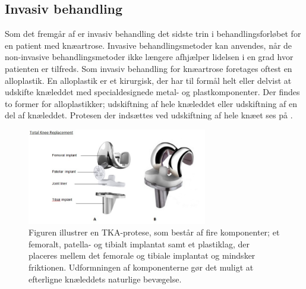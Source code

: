 
%

\subsection{Invasiv behandling} \label{kirurgiskbehandling}
Som det fremgår af  er invasiv behandling det sidste trin i behandlingsforløbet for en patient med knæartrose. Invasive behandlingsmetoder kan anvendes, når de non-invasive behandlingsmetoder ikke længere afhjælper lidelsen i en grad hvor patienten er tilfreds. Som invasiv behandling for knæartrose foretages oftest en alloplastik. En alloplastik er et kirurgisk, der har til formål helt eller delvist at udskifte knæleddet med specialdesignede metal- og plastkomponenter. Der findes to former for alloplastikker; udskiftning af hele knæleddet eller udskiftning af en del af knæleddet. \citep{brostrom2012} Protesen der indsættes ved udskiftning af hele knæet ses på .

\begin{figure}[H] 
\begin{center}
\includegraphics[width=0.7\textwidth]{figures/tka_implant}
\end{center}
\caption{Figuren illustrer en TKA-protese, som består af fire komponenter; et femoralt, patella- og tibialt implantat samt et plastiklag, der placeres mellem det femorale og tibiale implantat og mindsker friktionen. Udformningen af komponenterne gør det muligt at efterligne knæleddets naturlige bevægelse. \citep{robodoc2016}} 
\label{fig:tka_implant1} 
\end{figure}\vspace{-.25cm}

